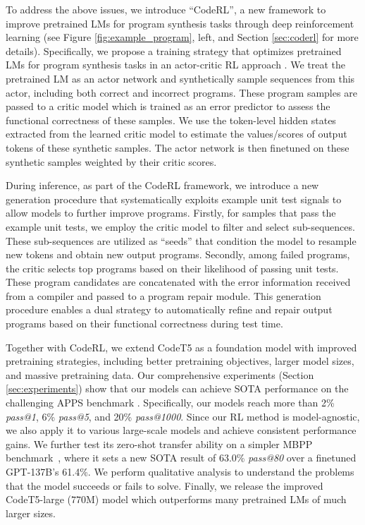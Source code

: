 \documentclass{article}
\begin{document}
To address the above issues, we introduce ``CodeRL'', a new framework to improve pretrained LMs for program synthesis tasks through deep reinforcement learning (see Figure \ref{fig:example_program}, left, and Section \ref{sec:coderl} for more details). 
Specifically, we propose a training strategy that optimizes pretrained LMs for program synthesis tasks in an actor-critic RL approach \citep{konda1999actor, sutton1999policy}.
We treat the pretrained LM as an actor network and synthetically sample sequences from this actor, including both correct and incorrect programs.
These program samples are passed to a critic model which is trained as an error predictor to assess the functional correctness of these samples.
We use the token-level hidden states extracted from the learned critic model to estimate the values/scores of output tokens of these synthetic samples. 
The actor network is then finetuned on these synthetic samples weighted by their critic scores. 

During inference, as part of the CodeRL framework, we introduce a new generation procedure that systematically exploits example unit test signals to allow models to further improve programs. 
Firstly, for samples that pass the example unit tests, we employ the critic model to filter and select sub-sequences.
These sub-sequences are utilized as ``seeds'' that condition the model to resample new tokens and obtain new output programs. 
Secondly, among failed programs, the critic selects top programs based on their likelihood of passing unit tests. 
These program candidates are concatenated with the error information received from a compiler and passed to a program repair module.
This generation procedure enables a dual strategy to automatically refine and repair output programs based on their functional correctness during test time. 



Together with CodeRL, we extend CodeT5 as a foundation model with improved pretraining strategies, including better pretraining objectives, larger model sizes, and massive pretraining data. 
Our comprehensive experiments (Section \ref{sec:experiments}) show that our models can achieve SOTA performance on the challenging APPS benchmark \citep{hendrycksapps2021}.
Specifically, our models reach more than 2\% \emph{pass@1}, 6\% \emph{pass@5}, and 20\% \emph{pass@1000}. 
Since our RL method is model-agnostic, we also apply it to various large-scale models and achieve consistent performance gains. 
We further test its zero-shot transfer ability on a simpler MBPP benchmark~\citep{austin2021program}, where it sets a new SOTA result of 63.0\% \emph{pass@80} over a finetuned GPT-137B's 61.4\%.
We perform qualitative analysis to understand the problems that the model succeeds or fails to solve. 
Finally, we release the improved CodeT5-large ($770$M) model which outperforms many pretrained LMs of much larger sizes.
\end{document}

